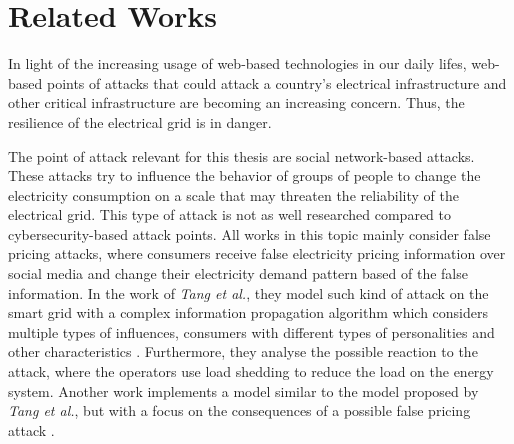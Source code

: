 \chapter{Related Works}

In light of the increasing usage of web-based technologies in our daily 
lifes, web-based points of attacks that could attack a country's 
electrical infrastructure and other critical infrastructure 
are becoming an increasing concern.
Thus, the resilience of the electrical grid is in danger.


The point of attack relevant for this thesis are social network-based
attacks. These attacks try to influence the behavior of groups of people to 
change the electricity consumption on a scale that may threaten the reliability
of the electrical grid. This type of attack is not as well researched 
compared to cybersecurity-based attack points. All works in this topic
mainly consider false pricing attacks, where consumers receive false 
electricity pricing information over social media and change their 
electricity demand pattern based of the false information.
In the work of \textit{Tang et al.}, they model such kind of attack on the 
smart grid with a complex information propagation algorithm which considers 
multiple types of influences, consumers with different types of 
personalities and other characteristics \cite{falsepricing1}.
Furthermore, they analyse the possible reaction to the attack, where
the operators use load shedding to reduce the load on the energy system. 
Another work implements a model similar to the model
proposed by \textit{Tang et al.}, but with a focus on the consequences of a 
possible false pricing attack \cite{vulnerabilityanalysis}.

